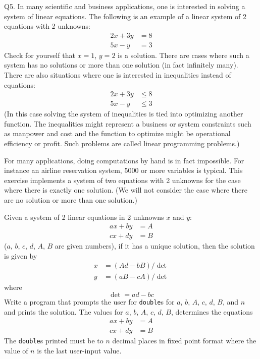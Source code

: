Q5. In many scientific and business applications, one is interested in solving a 
system of linear
equations. 
The following is an example of a linear system of 2 equations with 2 unknowns:
\begin{align*}
2x + 3y &= 8 \\
5x - y &= 3
\end{align*}
Check for yourself that $x = 1$, $y = 2$ is a solution. 
There are cases where such a system has no
solutions or more than one solution (in fact infinitely many). There are also situations where one is
interested in inequalities instead of equations:
\begin{align*}
2x + 3y &\leq 8 \\
5x -  y &\leq 3
\end{align*}
(In this case solving the system of inequalities is tied into optimizing 
another function. 
The inequalities
might represent a business or system constraints such as manpower and cost 
and the function to
optimize might be operational efficiency or profit. Such problems are called linear programming
problems.)

For many applications, doing computations by hand is in fact impossible. 
For instance an airline
reservation system, 5000 or more variables is typical. 
This exercise implements a system of two
equations with 2 unknowns for the case where there is exactly one solution. 
(We will not consider the
case where there are no solution or more than one solution.)

Given a system of 2 linear equations in 2 unknowns $x$ and $y$:
\begin{align*}
ax + by &= A \\
cx + dy &= B
\end{align*}
($a$, $b$, $c$, $d$, $A$, $B$ are given numbers), 
if it has a unique solution, then the solution is given by
\begin{align*}
x &= (Ad - bB) / \operatorname{det} \\
y &= (aB - cA) / \operatorname{det}
\end{align*}
where
\[
\operatorname{det} = ad - bc
\]
Write a program that prompts the user for \texttt{double}s for 
$a$, $b$, $A$, $c$, $d$, $B$, and $n$ and prints the solution. The
values for $a$, $b$, $A$, $c$, $d$, $B$,
determines the equations
\begin{align*}
ax + by &= A \\
cx + dy &= B
\end{align*}
The \texttt{double}s
printed must be to $n$ decimal places in fixed point format 
where the value of $n$ is the last
user-input value.

